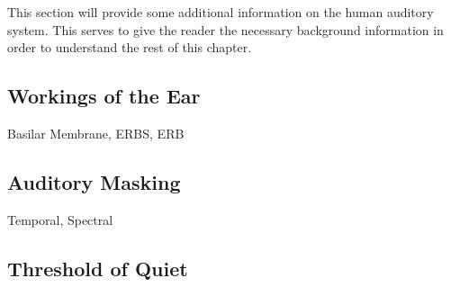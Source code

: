 This section will provide some additional information on the human auditory system.
This serves to give the reader the necessary background information in order to understand the rest of this chapter.

\subsection{Workings of the Ear}
Basilar Membrane, ERBS, ERB
\subsection{Auditory Masking}
Temporal, Spectral
\subsection{Threshold of Quiet}
